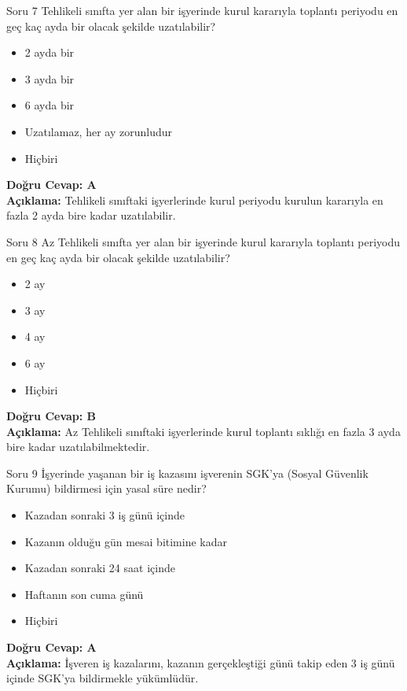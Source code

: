 \documentclass[12pt,a4paper]{article}
\begin{document}
\begin{testcard}{Soru 7}
    Tehlikeli sınıfta yer alan bir işyerinde kurul kararıyla toplantı periyodu en geç kaç ayda bir olacak şekilde uzatılabilir?
    \begin{itemize}
        \item[A)] 2 ayda bir
        \item[B)] 3 ayda bir
        \item[C)] 6 ayda bir
        \item[D)] Uzatılamaz, her ay zorunludur
        \item[E)] Hiçbiri
    \end{itemize}
    \tcblower
    \textbf{Doğru Cevap: A} \\
    \textbf{Açıklama:} Tehlikeli sınıftaki işyerlerinde kurul periyodu kurulun kararıyla en fazla 2 ayda bire kadar uzatılabilir.
\end{testcard}

\begin{testcard}{Soru 8}
    Az Tehlikeli sınıfta yer alan bir işyerinde kurul kararıyla toplantı periyodu en geç kaç ayda bir olacak şekilde uzatılabilir?
    \begin{itemize}
        \item[A)] 2 ay
        \item[B)] 3 ay
        \item[C)] 4 ay
        \item[D)] 6 ay
        \item[E)] Hiçbiri
    \end{itemize}
    \tcblower
    \textbf{Doğru Cevap: B} \\
    \textbf{Açıklama:} Az Tehlikeli sınıftaki işyerlerinde kurul toplantı sıklığı en fazla 3 ayda bire kadar uzatılabilmektedir.
\end{testcard}

\begin{testcard}{Soru 9}
    İşyerinde yaşanan bir iş kazasını işverenin SGK'ya (Sosyal Güvenlik Kurumu) bildirmesi için yasal süre nedir?
    \begin{itemize}
        \item[A)] Kazadan sonraki 3 iş günü içinde
        \item[B)] Kazanın olduğu gün mesai bitimine kadar
        \item[C)] Kazadan sonraki 24 saat içinde
        \item[D)] Haftanın son cuma günü
        \item[E)] Hiçbiri
    \end{itemize}
    \tcblower
    \textbf{Doğru Cevap: A} \\
    \textbf{Açıklama:} İşveren iş kazalarını, kazanın gerçekleştiği günü takip eden 3 iş günü içinde SGK'ya bildirmekle yükümlüdür.
\end{testcard}
\end{document}
